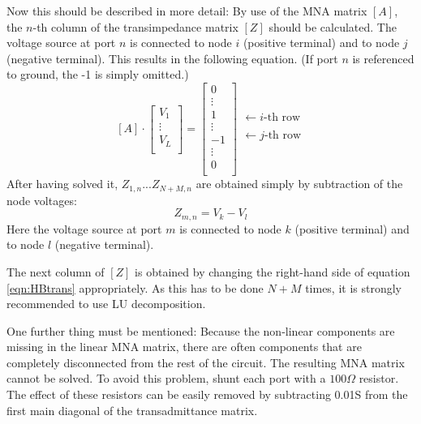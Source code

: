 \addvspace{12pt}

Now this should be described in more detail: By use of the MNA matrix
$[A]$, the $n$-th column of the transimpedance matrix $[Z]$ should be
calculated. The voltage source at port $n$ is connected to node $i$
(positive terminal) and to node $j$ (negative terminal). This results
in the following equation. (If port $n$ is referenced to ground, the
-1 is simply omitted.)
\begin{equation}
\label{eqn:HBtrans}
[A]\cdot
\begin{bmatrix}
V_1\\
\vdots\\
V_L\\
\end{bmatrix}
=
\begin{bmatrix}
0\\
\vdots\\
1\\
\vdots\\
-1\\
\vdots\\
0\\
\end{bmatrix}
\begin{matrix}
 \\
 \\
\leftarrow i\text{-th row}\\
 \\
\leftarrow j\text{-th row}\\
 \\
 \\
\end{matrix}
\end{equation}
After having solved it, $Z_{1,n}$...$Z_{N+M,n}$ are obtained
simply by subtraction of the node voltages:
\begin{equation}
Z_{m,n} = V_k - V_l
\end{equation}
Here the voltage source at port $m$ is connected to node $k$
(positive terminal) and to node $l$ (negative terminal).

\addvspace{12pt}

The next column of $[Z]$ is obtained by changing the right-hand
side of equation \eqref{eqn:HBtrans} appropriately. As this has to
be done $N+M$ times, it is strongly recommended to use LU
decomposition.

\addvspace{12pt}

One further thing must be mentioned: Because the non-linear
components are missing in the linear MNA matrix, there are often
components that are completely disconnected from the rest of the
circuit. The resulting MNA matrix cannot be solved. To avoid
this problem, shunt each port with a $100\Omega$ resistor. The
effect of these resistors can be easily removed by subtracting
0.01S from the first main diagonal of the transadmittance matrix.


